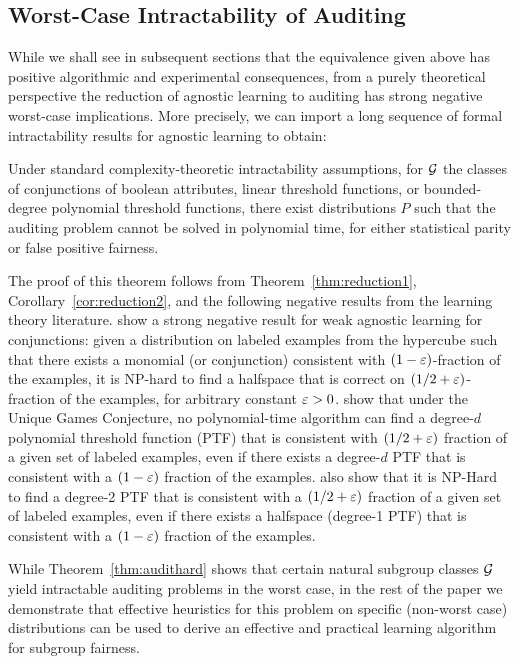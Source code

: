 \fi

\subsection{Worst-Case Intractability of Auditing}

While we shall see in subsequent sections that the equivalence given above
has positive algorithmic and experimental consequences, from a purely theoretical
perspective the reduction of agnostic
learning to auditing has strong negative worst-case implications. More precisely,
we can import a long sequence of formal intractability results for agnostic learning
to obtain:

\begin{theorem}
\label{thm:audithard}
Under standard complexity-theoretic intractability assumptions,
for $\mathcal{G}$ the classes of conjunctions of boolean attributes,
linear threshold functions, or
bounded-degree polynomial threshold functions, there exist distributions $P$
such that the auditing problem cannot be solved in polynomial time,
for either statistical parity or false positive fairness.
\end{theorem}

The proof of this theorem follows from Theorem~\ref{thm:reduction1}, Corollary~\ref{cor:reduction2},
and the following negative
results from the learning theory literature.
\cite{FGRW12} show a strong negative result for weak agnostic learning
for conjunctions: given a distribution on labeled examples from the
hypercube such that there exists a monomial (or conjunction)
consistent with $(1 - \varepsilon)$-fraction of the examples, it is NP-hard
to find a halfspace that is correct on $( 1/ 2 + \varepsilon)$-fraction of
the examples, for arbitrary constant $\varepsilon > 0$.
\cite{DOSW11} show that under the Unique Games Conjecture, no
polynomial-time algorithm can find a degree-$d$ polynomial threshold
function (PTF) that is consistent with $(1/2 + \varepsilon)$ fraction of a
given set of labeled examples, even if there exists a degree-$d$ PTF
that is consistent with a $(1 - \varepsilon)$ fraction of the examples.
\cite{DOSW11} also show that it is NP-Hard to find a degree-2 PTF that
is consistent with a $(1/2 + \varepsilon)$ fraction of a given set of labeled
examples, even if there exists a halfspace (degree-1 PTF) that is
consistent with a $(1 - \varepsilon)$ fraction of the examples.

While Theorem~\ref{thm:audithard} shows that certain natural subgroup classes $\mathcal{G}$ yield
intractable auditing problems in the worst case, in the rest of the paper we demonstrate
that effective heuristics for this problem on specific (non-worst case) distributions can be used to derive
an effective and practical learning algorithm for subgroup fairness.


